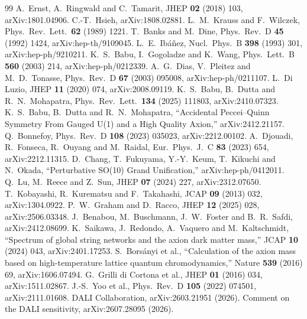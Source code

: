 \documentclass[11pt,a4paper]{article}
\begin{document}
\begin{thebibliography}{99}
\small
\sloppy
{} A.~Ernst, A.~Ringwald and C.~Tamarit,
  JHEP \textbf{02} (2018) 103, arXiv:1801.04906.
 C.-T.~Hsieh, arXiv:1808.02881.
 L.~M.~Krauss and F.~Wilczek,
  Phys.\ Rev.\ Lett.\ \textbf{62} (1989) 1221.
 T.~Banks and M.~Dine,
  Phys.\ Rev.\ D \textbf{45} (1992) 1424, arXiv:hep-th/9109045.
 L.~E.~Ib\'a\~nez,
  Nucl.\ Phys.\ B \textbf{398} (1993) 301, arXiv:hep-ph/9210211.
 K.~S.~Babu, I.~Gogoladze and K.~Wang,
  Phys.\ Lett.\ B \textbf{560} (2003) 214, arXiv:hep-ph/0212339.
 A.~G.~Dias, V.~Pleitez and M.~D.~Tonasse,
  Phys.\ Rev.\ D \textbf{67} (2003) 095008, arXiv:hep-ph/0211107.
 L.~Di Luzio, JHEP \textbf{11} (2020) 074,
  arXiv:2008.09119.
 K.~S.~Babu, B.~Dutta and R.~N.~Mohapatra,
  Phys.\ Rev.\ Lett.\ \textbf{134} (2025) 111803, arXiv:2410.07323.
 K.~S.~Babu, B.~Dutta and R.~N.~Mohapatra,
  ``Accidental Peccei--Quinn Symmetry From Gauged U(1) and a High
  Quality Axion,'' arXiv:2412.21157.
 Q.~Bonnefoy, Phys.\ Rev.\ D \textbf{108} (2023)
  035023, arXiv:2212.00102.
 A.~Djouadi, R.~Fonseca, R.~Ouyang and M.~Raidal,
  Eur.\ Phys.\ J.\ C \textbf{83} (2023) 654, arXiv:2212.11315.
 D.~Chang, T.~Fukuyama, Y.-Y.~Keum, T.~Kikuchi and
  N.~Okada, ``Perturbative SO(10) Grand Unification,''
  arXiv:hep-ph/0412011.
 Q.~Lu, M.~Reece and Z.~Sun, JHEP \textbf{07} (2024) 227,
  arXiv:2312.07650.
 T.~Kobayashi, R.~Kurematsu and F.~Takahashi,
  JCAP \textbf{09} (2013) 032, arXiv:1304.0922.
 P.~W.~Graham and D.~Racco, JHEP \textbf{12} (2025) 028,
  arXiv:2506.03348.
 J.~Benabou, M.~Buschmann, J.~W.~Foster and
  B.~R.~Safdi, arXiv:2412.08699.
 K.~Saikawa, J.~Redondo, A.~Vaquero and
  M.~Kaltschmidt, ``Spectrum of global string networks and the axion
  dark matter mass,'' JCAP \textbf{10} (2024) 043, arXiv:2401.17253.
 S.~Bors\'anyi et al., ``Calculation of the axion
  mass based on high-temperature lattice quantum chromodynamics,''
  Nature \textbf{539} (2016) 69, arXiv:1606.07494.
 G.~Grilli di Cortona et al.,
  JHEP \textbf{01} (2016) 034, arXiv:1511.02867.
 J.-S.~Yoo et al., Phys.\ Rev.\ D \textbf{105} (2022)
  074501, arXiv:2111.01608.
 DALI Collaboration, arXiv:2603.21951 (2026).
 Comment on the DALI sensitivity,
  arXiv:2607.28095 (2026).

\end{thebibliography}
\end{document}
